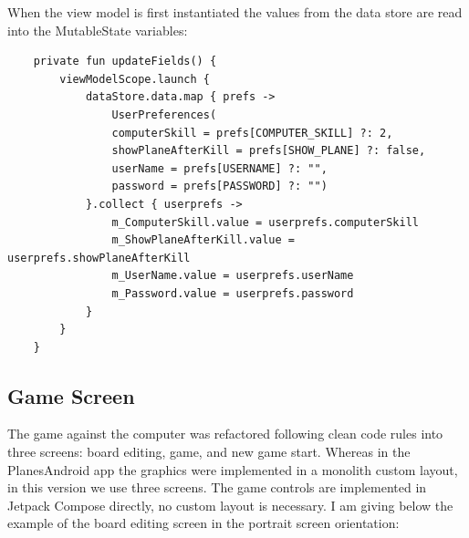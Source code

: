 When the view model is first instantiated the values from the data store are read into the MutableState variables:

\begin{lstlisting}
	private fun updateFields() {
		viewModelScope.launch {
			dataStore.data.map { prefs ->
				UserPreferences(
				computerSkill = prefs[COMPUTER_SKILL] ?: 2,
				showPlaneAfterKill = prefs[SHOW_PLANE] ?: false,
				userName = prefs[USERNAME] ?: "",
				password = prefs[PASSWORD] ?: "")
			}.collect { userprefs ->
				m_ComputerSkill.value = userprefs.computerSkill
				m_ShowPlaneAfterKill.value = userprefs.showPlaneAfterKill
				m_UserName.value = userprefs.userName
				m_Password.value = userprefs.password
			}	
		}
	}
\end{lstlisting}

\subsection {Game Screen}

The game against the computer was refactored following clean code rules into three screens: board editing, game, and new game start. Whereas in the PlanesAndroid app the graphics were implemented in a monolith custom layout, in this version we use three screens. The game controls are implemented in Jetpack Compose directly, no custom layout is necessary. I am giving below the example of the board editing screen in the portrait screen orientation:

